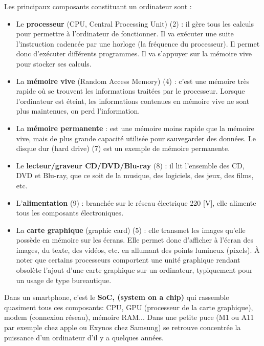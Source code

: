 \documentclass[11pt, a4paper]{book}
\begin{document}
Les principaux composants constituant un ordinateur sont :
\begin{itemize}%
    \item Le {\bf processeur} (CPU, Central Processing Unit) (2) : il gère tous les calculs pour permettre à l'ordinateur de fonctionner. Il va exécuter une suite l'instruction cadencée par une horloge (la fréquence du processeur). Il permet donc d'exécuter différents programmes. Il va s'appuyer sur la mémoire vive pour stocker ses calculs.
      
    \item  La {\bf mémoire vive} (Random Access Memory) (4) : c'est une mémoire très rapide où se trouvent les informations traitées par le processeur. Lorsque l'ordinateur est éteint, les informations contenues en mémoire vive ne sont plus maintenues, on perd l'information.

    \item La {\bf mémoire permanente} : est une mémoire moins rapide que la mémoire vive, mais de plus grande capacité utilisée pour sauvegarder des données. Le disque dur (hard drive) (7) est un exemple de mémoire permanente.
      
    \item  Le {\bf lecteur/graveur CD/DVD/Blu-ray } (8) : il lit l'ensemble des CD, DVD et Blu-ray, que ce soit de la musique, des logiciels, des jeux, des films, etc.
      
    \item L'{\bf alimentation} (9) : branchée sur le réseau électrique 220 [V], elle alimente tous les composants électroniques.
      
    \item La {\bf carte graphique} (graphic card) (5) : elle transmet les images qu'elle possède en mémoire sur les écrans. Elle permet donc d'afficher à l'écran des images, du texte, des vidéos, etc. en allumant des points lumineux (pixels). À noter que certains processeurs comportent une unité graphique rendant obsolète l'ajout d'une carte graphique sur un ordinateur, typiquement pour un usage de type bureautique.
\end{itemize}

\begin{remarque}
Dans un smartphone, c'est le {\bf SoC, (system on a chip)} qui rassemble quasiment tous ces composants: CPU, GPU (processeur de la carte graphique), modem (connexion réseau), mémoire RAM... Dans une petite puce (M1 ou A11 par exemple chez apple ou Exynos chez Samsung) se retrouve concentrée la puissance d'un ordinateur d'il y a quelques années.
\end{remarque}
\end{document}
